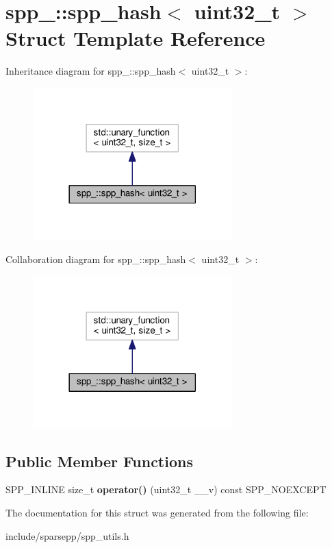 \hypertarget{structspp___1_1spp__hash_3_01uint32__t_01_4}{}\section{spp\+\_\+\+:\+:spp\+\_\+hash$<$ uint32\+\_\+t $>$ Struct Template Reference}
\label{structspp___1_1spp__hash_3_01uint32__t_01_4}


Inheritance diagram for spp\+\_\+\+:\+:spp\+\_\+hash$<$ uint32\+\_\+t $>$\+:\nopagebreak
\begin{figure}[H]
\begin{center}
\leavevmode
\includegraphics[width=218pt]{structspp___1_1spp__hash_3_01uint32__t_01_4__inherit__graph}
\end{center}
\end{figure}


Collaboration diagram for spp\+\_\+\+:\+:spp\+\_\+hash$<$ uint32\+\_\+t $>$\+:\nopagebreak
\begin{figure}[H]
\begin{center}
\leavevmode
\includegraphics[width=218pt]{structspp___1_1spp__hash_3_01uint32__t_01_4__coll__graph}
\end{center}
\end{figure}
\subsection*{Public Member Functions}
\begin{DoxyCompactItemize}
\item 
S\+P\+P\+\_\+\+I\+N\+L\+I\+NE size\+\_\+t {\bfseries operator()} (uint32\+\_\+t \+\_\+\+\_\+v) const S\+P\+P\+\_\+\+N\+O\+E\+X\+C\+E\+PT\hypertarget{structspp___1_1spp__hash_3_01uint32__t_01_4_a0eef9c8444232912ec67d0ef80ea711a}{}\label{structspp___1_1spp__hash_3_01uint32__t_01_4_a0eef9c8444232912ec67d0ef80ea711a}

\end{DoxyCompactItemize}


The documentation for this struct was generated from the following file\+:\begin{DoxyCompactItemize}
\item 
include/sparsepp/spp\+\_\+utils.\+h\end{DoxyCompactItemize}

